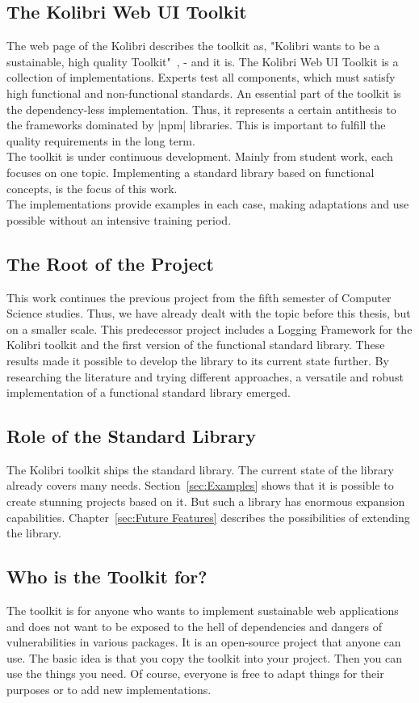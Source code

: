 \subsection{The Kolibri Web UI Toolkit}
\label{sub:The Kolibri Web UI Toolkit}
The web page of the Kolibri describes the toolkit as, "Kolibri wants to be a
sustainable, high quality Toolkit"~\cite{kolibri}, - and it is.
The Kolibri Web UI Toolkit is a collection of implementations. Experts test all
components, which must satisfy high functional and non-functional standards. An
essential part of the toolkit is the dependency-less implementation. Thus, it
represents a certain antithesis to the frameworks dominated by |npm| libraries.
This is important to fulfill the quality requirements in the long term.\\
The toolkit is under continuous development. Mainly from student work, each
focuses on one topic. Implementing a standard library based on functional
concepts, is the focus of this work. \\ 
The implementations provide examples in each case, making adaptations and use
possible without an intensive training period.

\subsection{The Root of the Project}
\label{sub:The Root of the Project}
This work continues the previous project from the fifth semester of Computer
Science studies. Thus, we have already dealt with the topic before this thesis,
but on a smaller scale. This predecessor project includes a Logging Framework
for the Kolibri toolkit and the first version of the functional standard
library. These results made it possible to develop the library to its current
state further. By researching the literature and trying different approaches, a
versatile and robust implementation of a functional standard library emerged.

\subsection{Role of the Standard Library}
\label{sub:Role of the Standard Library}
The Kolibri toolkit ships the standard library. The current state of the
library already covers many needs. Section~\ref{sec:Examples} shows that it is
possible to create stunning projects based on it. But such a library has
enormous expansion capabilities. Chapter~\ref{sec:Future Features} describes
the possibilities of extending the library.

\subsection{Who is the Toolkit for?}
\label{sub:Who is the Toolkit for?}
The toolkit is for anyone who wants to implement sustainable web applications 
and does not want to be exposed to the hell of dependencies and dangers
of vulnerabilities in various packages. It is an open-source project that
anyone can use. The basic idea is that you copy the toolkit into your project.
Then you can use the things you need. Of course, everyone is free to adapt
things for their purposes or to add new implementations.
